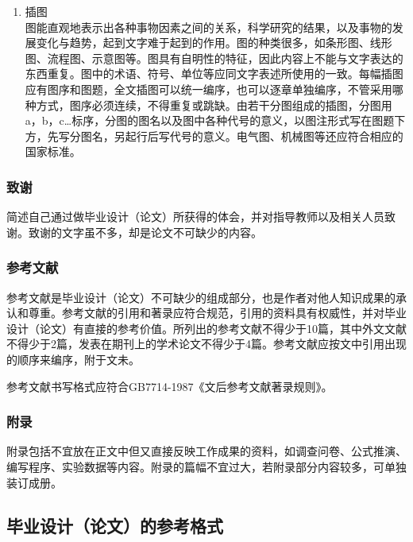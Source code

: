 \documentclass{HDU-Bachelor-Thesis}
\begin{document}
\begin{enumerate}
    \item 插图\\
    图能直观地表示出各种事物因素之间的关系，科学研究的结果，以及事物的发展变化与趋势，起到文字难于起到的作用。图的种类很多，如条形图、线形图、流程图、示意图等。图具有自明性的特征，因此内容上不能与文字表达的东西重复。图中的术语、符号、单位等应同文字表述所使用的一致。每幅插图应有图序和图题，全文插图可以统一编序，也可以逐章单独编序，不管采用哪种方式，图序必须连续，不得重复或跳缺。由若干分图组成的插图，分图用a，b，c…标序，分图的图名以及图中各种代号的意义，以图注形式写在图题下方，先写分图名，另起行后写代号的意义。电气图、机械图等还应符合相应的国家标准。

\end{enumerate}

\subsubsection{致谢}

简述自己通过做毕业设计（论文）所获得的体会，并对指导教师以及相关人员致谢。致谢的文字虽不多，却是论文不可缺少的内容。

\subsubsection{参考文献}

参考文献是毕业设计（论文）不可缺少的组成部分，也是作者对他人知识成果的承认和尊重。参考文献的引用和著录应符合规范，引用的资料具有权威性，并对毕业设计（论文）有直接的参考价值。所列出的参考文献不得少于10篇，其中外文文献不得少于2篇，发表在期刊上的学术论文不得少于4篇。参考文献应按文中引用出现的顺序来编序，附于文未。

参考文献书写格式应符合GB7714-1987《文后参考文献著录规则》\cite{gb7714-1987}。

\subsubsection{附录}

附录包括不宜放在正文中但又直接反映工作成果的资料，如调查问卷、公式推演、编写程序、实验数据等内容。附录的篇幅不宜过大，若附录部分内容较多，可单独装订成册。

\subsection{毕业设计（论文）的参考格式}
\end{document}

